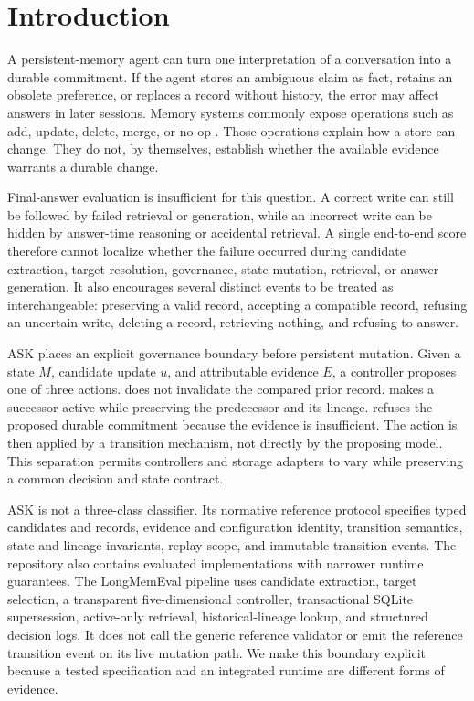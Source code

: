 \section{Introduction}
\label{sec:intro}

A persistent-memory agent can turn one interpretation of a conversation into a
durable commitment. If the agent stores an ambiguous claim as fact, retains an
obsolete preference, or replaces a record without history, the error may affect
answers in later sessions. Memory systems commonly expose operations such as
add, update, delete, merge, or no-op \citep{packer2023memgpt,chhikara2025mem0,
yan2025memoryr1}. Those operations explain how a store can change. They do not,
by themselves, establish whether the available evidence warrants a durable
change.

Final-answer evaluation is insufficient for this question. A correct write can
still be followed by failed retrieval or generation, while an incorrect write
can be hidden by answer-time reasoning or accidental retrieval. A single
end-to-end score therefore cannot localize whether the failure occurred during
candidate extraction, target resolution, governance, state mutation,
retrieval, or answer generation. It also encourages several distinct events to
be treated as interchangeable: preserving a valid record, accepting a
compatible record, refusing an uncertain write, deleting a record, retrieving
nothing, and refusing to answer.

ASK places an explicit governance boundary before persistent mutation. Given a
state $M$, candidate update $u$, and attributable evidence $E$, a controller
proposes one of three actions. \keep{} does not invalidate the compared prior
record. \supersede{} makes a successor active while preserving the predecessor
and its lineage. \abstain{} refuses the proposed durable commitment because the
evidence is insufficient. The action is then applied by a transition mechanism,
not directly by the proposing model. This separation permits controllers and
storage adapters to vary while preserving a common decision and state contract.

ASK is not a three-class classifier. Its normative reference protocol specifies
typed candidates and records, evidence and configuration identity, transition
semantics, state and lineage invariants, replay scope, and immutable transition
events. The repository also contains evaluated implementations with narrower
runtime guarantees. The LongMemEval pipeline uses candidate extraction, target
selection, a transparent five-dimensional controller, transactional SQLite
supersession, active-only retrieval, historical-lineage lookup, and structured
decision logs. It does not call the generic reference validator or emit the
reference transition event on its live mutation path. We make this boundary
explicit because a tested specification and an integrated runtime are different
forms of evidence.

